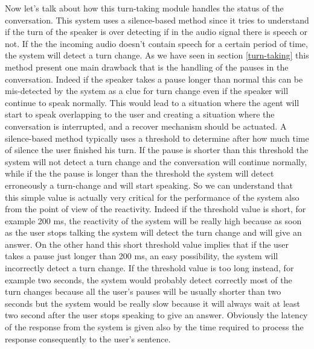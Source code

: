 \documentclass[../main.tex]{subfiles}
\begin{document}
Now let's talk about how this turn-taking module handles the status of the conversation. This system uses a silence-based method since it tries to understand if the turn of the speaker is over detecting if in the audio signal there is speech or not. If the the incoming audio doesn't contain speech for a certain period of time, the system will detect a turn change. As we have seen in section \ref{turn-taking} this method present one main drawback that is the handling of the pauses in the conversation. Indeed if the speaker takes a pause longer than normal this can be mis-detected by the system as a clue for turn change even if the speaker will continue to speak normally. This would lead to a situation where the agent will start to speak overlapping to the user and creating a situation where the conversation is interrupted, and a recover mechanism should be actuated. A silence-based method typically uses a threshold to determine after how much time of silence the user finished his turn. If the pause is shorter than this threshold the system will not detect a turn change and the conversation will continue normally, while if the the pause is longer than the threshold the system will detect erroneously a turn-change and will start speaking. So we can understand that this simple value is actually very critical for the performance of the system also from the point of view of the reactivity. Indeed if the threshold value is short, for example 200 ms, the reactivity of the system will be really high because as soon as the user stops talking the system will detect the turn change and will give an answer. On the other hand this short threshold value implies that if the user takes a pause just longer than 200 ms, an easy possibility, the system will incorrectly detect a turn change. If the threshold value is too long instead, for example two seconds, the system would probably detect correctly most of the turn changes because all the user's pauses will be usually shorter than two seconds but the system would be really slow because it will always wait at least two second after the user stops speaking to give an answer. Obviously the latency of the response from the system is given also by the time required to process the response consequently to the user's sentence. 
\end{document}
